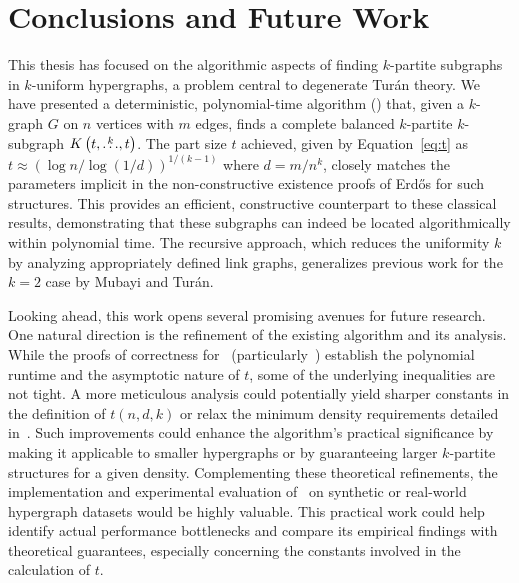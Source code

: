 \section{Conclusions and Future Work}\label{sec:conclusions}

This thesis has focused on the algorithmic aspects of finding $k$-partite subgraphs in $k$-uniform hypergraphs,
a problem central to degenerate Turán theory.
We have presented a deterministic,
polynomial-time algorithm () that, given a $k$-graph $G$ on $n$ vertices with $m$ edges,
finds a complete balanced $k$-partite $k$-subgraph $K\left(t, \overset{k}{\dots}, t\right)$.
The part size $t$ achieved, given by Equation~\eqref{eq:t} as $t \approx (\log n / \log(1/d))^{1/(k-1)}$ where $d=m/n^k$,
closely matches the parameters implicit in the non-constructive existence proofs of Erd\H{o}s for such structures.
This provides an efficient, constructive counterpart to these classical results,
demonstrating that these subgraphs can indeed be located algorithmically within polynomial time.
The recursive approach, which reduces the uniformity $k$ by analyzing appropriately defined link graphs,
generalizes previous work for the $k=2$
case by Mubayi and Turán.

Looking ahead, this work opens several promising avenues for future research.
One natural direction is the refinement of the existing algorithm and its analysis.
While the proofs of correctness for~
(particularly~) establish the polynomial runtime and the asymptotic
nature of $t$, some of the underlying inequalities are not tight.
A more meticulous analysis could potentially yield sharper constants in the definition of $t(n,d,k)$
or relax the minimum density requirements detailed in~.
Such improvements could enhance the algorithm's practical significance by making it applicable to smaller hypergraphs
or by guaranteeing larger $k$-partite structures for a given density.
Complementing these theoretical refinements, the implementation and experimental evaluation of~
on synthetic or real-world hypergraph datasets would be highly valuable.
This practical work could help identify actual performance bottlenecks and compare its empirical findings with theoretical
guarantees, especially concerning the constants involved in the calculation of $t$.


